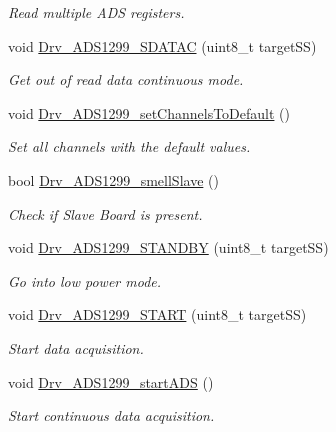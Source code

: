 \begin{DoxyCompactItemize}
\begin{DoxyCompactList}\small\item\em Read multiple A\+DS registers. \end{DoxyCompactList}\item 
void \hyperlink{group__ADS1299__Library_ga9715d3a40b02158b668d9c82bd0af79a}{Drv\+\_\+\+A\+D\+S1299\+\_\+\+S\+D\+A\+T\+AC} (uint8\+\_\+t target\+SS)
\begin{DoxyCompactList}\small\item\em Get out of read data continuous mode. \end{DoxyCompactList}\item 
void \hyperlink{group__ADS1299__Library_gada2653d98d54cb667537d468a5a3e4ce}{Drv\+\_\+\+A\+D\+S1299\+\_\+set\+Channels\+To\+Default} ()
\begin{DoxyCompactList}\small\item\em Set all channels with the default values. \end{DoxyCompactList}\item 
bool \hyperlink{group__ADS1299__Library_ga9d74c4bec77d3719c9334d953e2ac590}{Drv\+\_\+\+A\+D\+S1299\+\_\+smell\+Slave} ()
\begin{DoxyCompactList}\small\item\em Check if Slave Board is present. \end{DoxyCompactList}\item 
void \hyperlink{group__ADS1299__Library_ga47ebee464895e8e771d03c0f9ca5e21d}{Drv\+\_\+\+A\+D\+S1299\+\_\+\+S\+T\+A\+N\+D\+BY} (uint8\+\_\+t target\+SS)
\begin{DoxyCompactList}\small\item\em Go into low power mode. \end{DoxyCompactList}\item 
void \hyperlink{group__ADS1299__Library_gab74ff026d8a21e4c41ec454debdf0928}{Drv\+\_\+\+A\+D\+S1299\+\_\+\+S\+T\+A\+RT} (uint8\+\_\+t target\+SS)
\begin{DoxyCompactList}\small\item\em Start data acquisition. \end{DoxyCompactList}\item 
void \hyperlink{group__ADS1299__Library_gad2841df2e1508c7d9f86d0d90681986e}{Drv\+\_\+\+A\+D\+S1299\+\_\+start\+A\+DS} ()
\begin{DoxyCompactList}\small\item\em Start continuous data acquisition. \end{DoxyCompactList}\item 

\end{DoxyCompactItemize}
